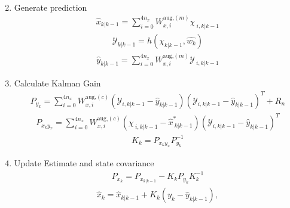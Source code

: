 \begin{enumerate}
\begin{align*}
    \end{align*}
    \item Generate prediction
    \begin{align*}
        \hat{x}_{k|k-1} = \sum_{i=0}^{4n_{x}} W^{\text{aug,}(m)}_{x,i} \chi_{\ i, k|k-1} 
        \end{align*}
         \begin{align*}
        \mathcal{Y}_{k|k-1} = h(\chi_{k|k-1},\hat{w_{k}}) 
        \end{align*}
         \begin{align*}
        \hat{y}_{k|k-1} = \sum_{i=0}^{4n_{x}} W^{\text{aug,}(m)}_{x,i} \mathcal{Y}_{\ i, k|k-1}
    \end{align*}
    \item Calculate Kalman Gain
    \begin{align*}
        P_{y_{k}} = \sum_{i=0}^{4n_{x}} W^{\text{aug,}(c)}_{x,i} (\mathcal{Y}_{i, k|k-1} - \hat{y}_{k|k-1})(\mathcal{Y}_{i, k|k-1} - \hat{y}_{k|k-1})^{T} + R_{n}   %
        \end{align*}
        \begin{align*}
        P_{x_{k}y_{x}} = \sum_{i=0}^{4n_{x}} W^{\text{aug,}(c)}_{x,i} (\chi_{\ i, k|k-1} - \hat{x}^{*}_{\ k|k-1})(\mathcal{Y}_{i, k|k-1} - \hat{y}_{k|k-1})^{T} 
        \end{align*}
        \begin{align*}
        K_{k} = P_{x_{k}y_{x}}P^{-1}_{y_{k}}
    \end{align*}
    \item Update Estimate and state covariance
   \begin{align*}
        P_{x_{k}} = P_{x_{k|k-1}} - K_{k}P_{y_{k}}K^{-1}_{k} 
   \end{align*}
    \begin{align*}
        \hat{x}_{k} = \hat{x}_{k|k-1} + K_{k}(y_{k}-\hat{y}_{k|k-1}),
    \end{align*}
    
\end{enumerate}